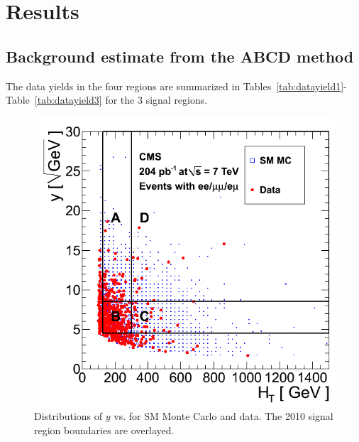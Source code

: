
\section{Results}
\label{sec:results}

\subsection{Background estimate from the ABCD method}
\label{sec:abcdres}

The data yields in the 
four regions are summarized in Tables~\ref{tab:datayield1}-Table~\ref{tab:datayield3}
for the 3 signal regions.

\newpage


\begin{figure}[tbh]
\begin{center}
\includegraphics[width=0.75\linewidth]{plots/abcd_204pb_2010.png}
\caption{\label{fig:abcdData1}\protect Distributions of $y$ 
vs. \Ht for SM Monte Carlo and data. The 2010 signal region boundaries are overlayed.}
\end{center}
\end{figure}

